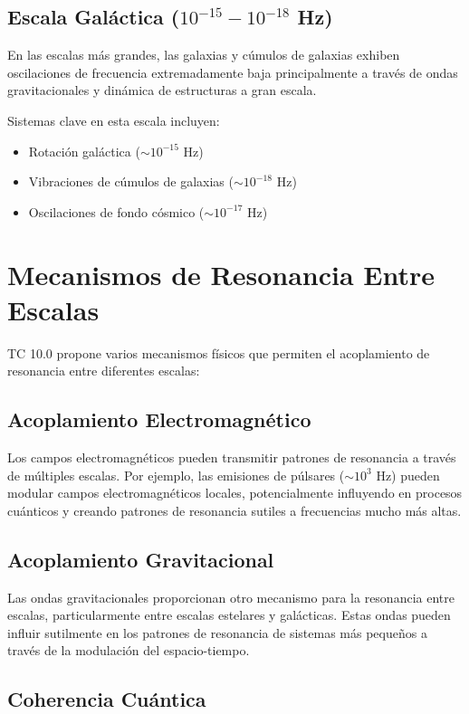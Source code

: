 \documentclass[12pt]{article}
\begin{document}
\subsection{Escala Galáctica ($10^{-15}-10^{-18}$ Hz)}

En las escalas más grandes, las galaxias y cúmulos de galaxias exhiben oscilaciones de frecuencia extremadamente baja principalmente a través de ondas gravitacionales y dinámica de estructuras a gran escala.

Sistemas clave en esta escala incluyen:
\begin{itemize}
    \item Rotación galáctica ($\sim 10^{-15}$ Hz)
    \item Vibraciones de cúmulos de galaxias ($\sim 10^{-18}$ Hz)
    \item Oscilaciones de fondo cósmico ($\sim 10^{-17}$ Hz)
\end{itemize}

\section{Mecanismos de Resonancia Entre Escalas}

TC 10.0 propone varios mecanismos físicos que permiten el acoplamiento de resonancia entre diferentes escalas:

\subsection{Acoplamiento Electromagnético}

Los campos electromagnéticos pueden transmitir patrones de resonancia a través de múltiples escalas. Por ejemplo, las emisiones de púlsares ($\sim 10^{3}$ Hz) pueden modular campos electromagnéticos locales, potencialmente influyendo en procesos cuánticos y creando patrones de resonancia sutiles a frecuencias mucho más altas.

\subsection{Acoplamiento Gravitacional}

Las ondas gravitacionales proporcionan otro mecanismo para la resonancia entre escalas, particularmente entre escalas estelares y galácticas. Estas ondas pueden influir sutilmente en los patrones de resonancia de sistemas más pequeños a través de la modulación del espacio-tiempo.

\subsection{Coherencia Cuántica}
\end{document}
